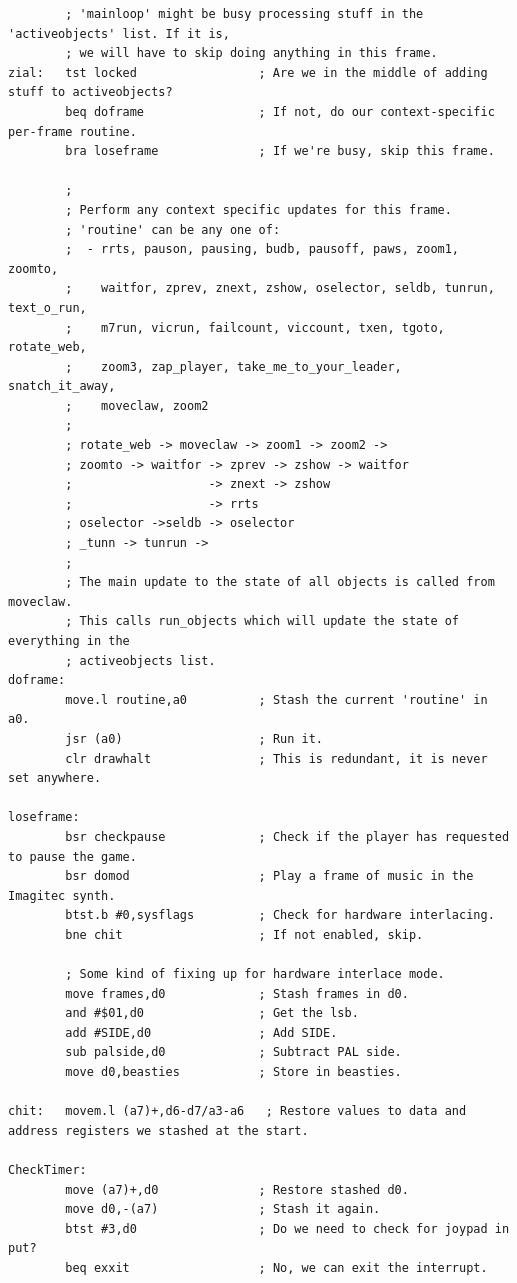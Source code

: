 \begin{lstlisting}
        ; 'mainloop' might be busy processing stuff in the 'activeobjects' list. If it is,
        ; we will have to skip doing anything in this frame.
zial:   tst locked                 ; Are we in the middle of adding stuff to activeobjects?
        beq doframe                ; If not, do our context-specific per-frame routine.
        bra loseframe              ; If we're busy, skip this frame.
    
        ;
        ; Perform any context specific updates for this frame.
        ; 'routine' can be any one of:
        ;  - rrts, pauson, pausing, budb, pausoff, paws, zoom1, zoomto,
        ;    waitfor, zprev, znext, zshow, oselector, seldb, tunrun, text_o_run,
        ;    m7run, vicrun, failcount, viccount, txen, tgoto, rotate_web,
        ;    zoom3, zap_player, take_me_to_your_leader, snatch_it_away,
        ;    moveclaw, zoom2
        ;
        ; rotate_web -> moveclaw -> zoom1 -> zoom2 ->
        ; zoomto -> waitfor -> zprev -> zshow -> waitfor
        ;                   -> znext -> zshow
        ;                   -> rrts
        ; oselector ->seldb -> oselector
        ; _tunn -> tunrun ->
        ;
        ; The main update to the state of all objects is called from moveclaw.
        ; This calls run_objects which will update the state of everything in the
        ; activeobjects list.
doframe:
        move.l routine,a0          ; Stash the current 'routine' in a0.
        jsr (a0)                   ; Run it.
        clr drawhalt               ; This is redundant, it is never set anywhere.
    
loseframe:
        bsr checkpause             ; Check if the player has requested to pause the game.
        bsr domod                  ; Play a frame of music in the Imagitec synth.
        btst.b #0,sysflags         ; Check for hardware interlacing.
        bne chit                   ; If not enabled, skip.
    
        ; Some kind of fixing up for hardware interlace mode.
        move frames,d0             ; Stash frames in d0.
        and #$01,d0                ; Get the lsb.
        add #SIDE,d0               ; Add SIDE.
        sub palside,d0             ; Subtract PAL side.
        move d0,beasties           ; Store in beasties.
    
chit:   movem.l (a7)+,d6-d7/a3-a6   ; Restore values to data and address registers we stashed at the start.
    
CheckTimer:
        move (a7)+,d0              ; Restore stashed d0.
        move d0,-(a7)              ; Stash it again.
        btst #3,d0                 ; Do we need to check for joypad in put?
        beq exxit                  ; No, we can exit the interrupt.
    

\end{lstlisting}
